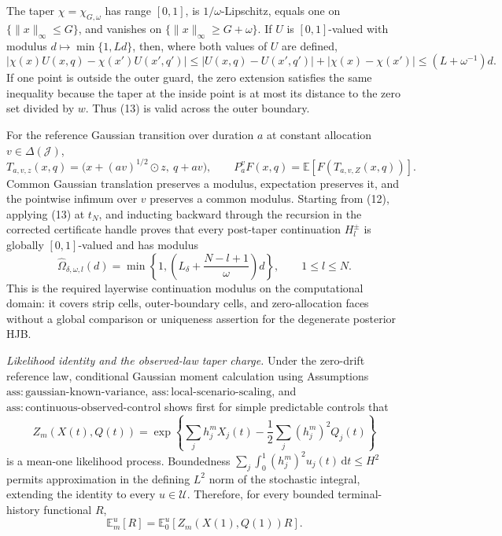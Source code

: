The taper \(\chi=\chi_{G,\omega}\) has range \([0,1]\), is \(1/\omega\)-Lipschitz, equals one on \(\{\|x\|_\infty\leq G\}\), and vanishes on \(\{\|x\|_\infty\geq G+\omega\}\).  If \(U\) is \([0,1]\)-valued with modulus \(d\mapsto\min\{1,Ld\}\), then, where both values of \(U\) are defined,
\[
 |\chi(x)U(x,q)-\chi(x')U(x',q')|
 \leq |U(x,q)-U(x',q')|+|\chi(x)-\chi(x')|
 \leq(L+\omega^{-1})d.
 \tag{13}
\]
If one point is outside the outer guard, the zero extension satisfies the same inequality because the taper at the inside point is at most its distance to the zero set divided by \(w\).  Thus (13) is valid across the outer boundary.

For the reference Gaussian transition over duration \(a\) at constant allocation \(v\in\Delta(\mathcal J)\),
\[
 T_{a,v,z}(x,q)=
 \bigl(x+(av)^{1/2}\mathbin\odot z,\ q+av\bigr),
 \qquad P_a^vF(x,q)=\mathbb E[F(T_{a,v,Z}(x,q))].
 \tag{14}
\]
Common Gaussian translation preserves a modulus, expectation preserves it, and the pointwise infimum over \(v\) preserves a common modulus.  Starting from (12), applying (13) at \(t_N\), and inducting backward through the recursion in the corrected certificate handle proves that every post-taper continuation \(H_l^\pm\) is globally \([0,1]\)-valued and has modulus
\[
 \widehat\Omega_{\delta,\omega,l}(d)
 =\min\!\left\{1,\left(L_\delta+\frac{N-l+1}{\omega}\right)d\right\},
 \qquad 1\leq l\leq N.
 \tag{15}
\]
This is the required layerwise continuation modulus on the computational domain: it covers strip cells, outer-boundary cells, and zero-allocation faces without a global comparison or uniqueness assertion for the degenerate posterior HJB.

\emph{Likelihood identity and the observed-law taper charge.}
Under the zero-drift reference law, conditional Gaussian moment calculation using Assumptions \(\mathrm{ass{:}gaussian\text{-}known\text{-}variance}\), \(\mathrm{ass{:}local\text{-}scenario\text{-}scaling}\), and \(\mathrm{ass{:}continuous\text{-}observed\text{-}control}\) shows first for simple predictable controls that
\[
 Z_m(X(t),Q(t))=
 \exp\!\left\{\sum_jh_j^mX_j(t)-\frac12\sum_j(h_j^m)^2Q_j(t)\right\}
 \tag{16}
\]
is a mean-one likelihood process.  Boundedness
\(\sum_j\int_0^1(h_j^m)^2u_j(t)\,\mathrm dt\leq H^2\) permits approximation in the defining \(L^2\) norm of the stochastic integral, extending the identity to every \(u\in\mathcal U\).  Therefore, for every bounded terminal-history functional \(R\),
\[
 \mathbb E_m^u[R]=\mathbb E_0^u[Z_m(X(1),Q(1))R].
 \tag{17}
\]

